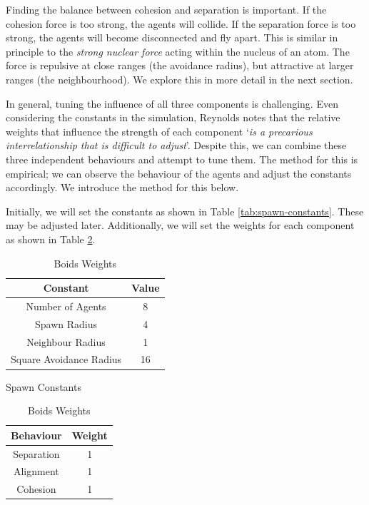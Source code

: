 \documentclass{article}
\begin{document}
Finding the balance between cohesion and separation is important. If the cohesion force is too strong, the agents will collide. If the separation force is too strong, the agents will become disconnected and fly apart. This is similar in principle to the \emph{strong nuclear force} acting within the nucleus of an atom. The force is repulsive at close ranges (the avoidance radius), but attractive at larger ranges (the neighbourhood). We explore this in more detail in the next section.

In general, tuning the influence of all three components is challenging. Even considering the constants in the simulation, Reynolds notes that the relative weights that influence the strength of each component `\emph{is a precarious interrelationship that is difficult to adjust}'. Despite this, we can combine these three independent behaviours and attempt to tune them. The method for this is empirical; we can observe the behaviour of the agents and adjust the constants accordingly. We introduce the method for this below.

Initially, we will set the constants as shown in Table \ref{tab:spawn-constants}. These may be adjusted later. Additionally, we will set the weights for each component as shown in Table \ref{tab:boids-weights}.

\begin{table}[h]
    \begin{minipage}{0.45\textwidth}
        \centering
        \begin{tabular}{| c | c |} 
        \hline
        Constant & Value \\ 
        \hline\hline
        Number of Agents & 8 \\
        \hline
        Spawn Radius & 4 \\
        \hline
        Neighbour Radius & 1 \\
        \hline
        Square Avoidance Radius & 16 \\
        \hline
        \end{tabular}
        \caption{Spawn Constants}
        \label{tab:spawn-constants}
    \end{minipage}
    \hfill
    \begin{minipage}{0.45\textwidth}
        \centering
        \begin{tabular}{| c | c |} 
        \hline
        Behaviour & Weight \\ 
        \hline\hline
        Separation & 1 \\
        \hline
        Alignment & 1 \\
        \hline
        Cohesion & 1 \\
        \hline
        \end{tabular}
        \caption{Boids Weights}
        \label{tab:boids-weights}
    \end{minipage}
\end{table}
\end{document}
